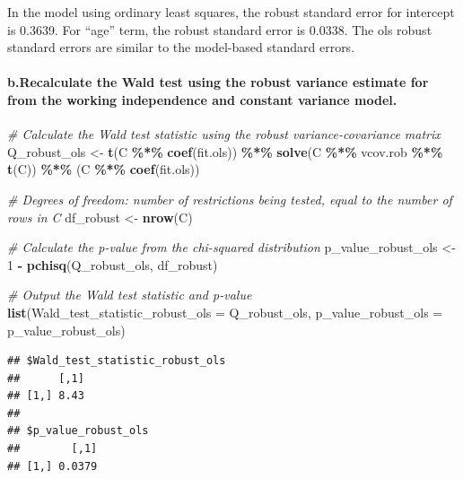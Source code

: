 \documentclass[
]{article}
\newenvironment{Shaded}{\begin{snugshade}}{\end{snugshade}}
\newcommand{\AttributeTok}[1]{\textcolor[rgb]{0.13,0.29,0.53}{#1}}
\newcommand{\CommentTok}[1]{\textcolor[rgb]{0.56,0.35,0.01}{\textit{#1}}}
\newcommand{\DecValTok}[1]{\textcolor[rgb]{0.00,0.00,0.81}{#1}}
\newcommand{\FunctionTok}[1]{\textcolor[rgb]{0.13,0.29,0.53}{\textbf{#1}}}
\newcommand{\NormalTok}[1]{#1}
\newcommand{\OtherTok}[1]{\textcolor[rgb]{0.56,0.35,0.01}{#1}}
\newcommand{\SpecialCharTok}[1]{\textcolor[rgb]{0.81,0.36,0.00}{\textbf{#1}}}
\begin{document}
In the model using ordinary least squares, the robust standard error for
intercept is 0.3639. For ``age'' term, the robust standard error is
0.0338. The ols robust standard errors are similar to the model-based
standard errors.

\hypertarget{b.recalculate-the-wald-test-using-the-robust-variance-estimate-for-from-the-working-independence-and-constant-variance-model.}{%
\paragraph{b.Recalculate the Wald test using the robust variance
estimate for from the working independence and constant variance
model.}\label{b.recalculate-the-wald-test-using-the-robust-variance-estimate-for-from-the-working-independence-and-constant-variance-model.}}

\begin{Shaded}
\begin{Highlighting}[]
\CommentTok{\# Calculate the Wald test statistic using the robust variance{-}covariance matrix}
\NormalTok{Q\_robust\_ols }\OtherTok{\textless{}{-}} \FunctionTok{t}\NormalTok{(C }\SpecialCharTok{\%*\%} \FunctionTok{coef}\NormalTok{(fit.ols)) }\SpecialCharTok{\%*\%} \FunctionTok{solve}\NormalTok{(C }\SpecialCharTok{\%*\%}\NormalTok{ vcov.rob }\SpecialCharTok{\%*\%} \FunctionTok{t}\NormalTok{(C)) }\SpecialCharTok{\%*\%}\NormalTok{ (C }\SpecialCharTok{\%*\%} \FunctionTok{coef}\NormalTok{(fit.ols))}

\CommentTok{\# Degrees of freedom: number of restrictions being tested, equal to the number of rows in C}
\NormalTok{df\_robust }\OtherTok{\textless{}{-}} \FunctionTok{nrow}\NormalTok{(C)}

\CommentTok{\# Calculate the p{-}value from the chi{-}squared distribution}
\NormalTok{p\_value\_robust\_ols }\OtherTok{\textless{}{-}} \DecValTok{1} \SpecialCharTok{{-}} \FunctionTok{pchisq}\NormalTok{(Q\_robust\_ols, df\_robust)}

\CommentTok{\# Output the Wald test statistic and p{-}value}
\FunctionTok{list}\NormalTok{(}\AttributeTok{Wald\_test\_statistic\_robust\_ols =}\NormalTok{ Q\_robust\_ols, }\AttributeTok{p\_value\_robust\_ols =}\NormalTok{ p\_value\_robust\_ols)}
\end{Highlighting}
\end{Shaded}

\begin{verbatim}
## $Wald_test_statistic_robust_ols
##      [,1]
## [1,] 8.43
## 
## $p_value_robust_ols
##        [,1]
## [1,] 0.0379
\end{verbatim}
\end{document}

